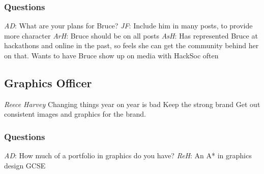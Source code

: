 \documentclass[11pt]{meetingmins}
\begin{document}
\subsubsection{Questions}
\begin{items}
	\item
	\textit{AD}: What are your plans for Bruce?	
		\subitem
		\textit{JF}:
			\subsubitem
			Include him in many posts, to provide more character
		\subitem
		\textit{ArH}:
			\subsubitem
			Bruce should be on all posts
		\subitem
		\textit{AsH}:
			\subsubitem
			Has represented Bruce at hackathons and online in the past, so feels she can get the community behind her on that.
			\subsubitem
			Wants to have Bruce show up on media with HackSoc often
\end{items}

\subsection{Graphics Officer}
\begin{items}
	\item
	\textit{Reece Harvey}
		\subitem
		Changing things year on year is bad
		\subitem
		Keep the strong brand
		\subitem
		Get out consistent images and graphics for the brand.
\end{items}

\subsubsection{Questions}
\begin{items}
	\item
	\textit{AD}: How much of a portfolio in graphics do you have?
		\subitem
		\textit{ReH}:
			\subsubitem
			An A* in graphics design GCSE
\end{items}
\end{document}
